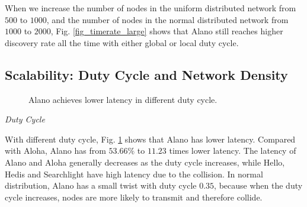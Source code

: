 When we increase the number of nodes in the uniform distributed  network from $500$ to $1000$, and the number of nodes in the normal distributed network from $1000$ to $2000$, Fig. \ref{fig_timerate_large} shows that Alano still reaches higher discovery rate all the time with either global or local duty cycle.



\subsection{Scalability: Duty Cycle and Network Density}

\begin{figure}[!t]
\centering
{}
\hspace{0.01in}
\caption{Alano achieves lower latency in different duty cycle.}
\label{fig_dutycycle}
\end{figure}

\emph{Duty Cycle} 

With different duty cycle, Fig. \ref{fig_dutycycle} shows that Alano has lower latency. Compared with Aloha, Alano has from $53.66\%$ to $11.23$ times lower latency. The latency of Alano and Aloha generally decreases as the duty cycle increases, while Hello, Hedis and Searchlight have high latency due to the collision. In normal distribution, Alano has a small twist with duty cycle $0.35$, because when the duty cycle increases, nodes are more likely to transmit and therefore collide.


